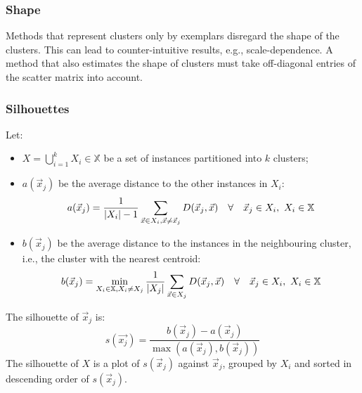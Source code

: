 \subsubsection{Shape}

Methods that represent clusters only by exemplars disregard the shape of the
clusters.
This can lead to counter-intuitive results, e.g., scale-dependence.
A method that also estimates the shape of clusters must take off-diagonal
entries of the scatter matrix into account.

\subsubsection{Silhouettes}

\begin{dfn}[Silhouette]
  Let:
  \begin{itemize}
    \item $X = \bigcup_{i = 1}^{k} X_i \in \mathbb{X}$ be a set of instances
          partitioned into $k$ clusters;
    \item $a(\vec{x}_j)$ be the average distance to the other instances in $X_i$:
          \begin{equation}
            a(\vec{x}_j) =
            \frac{1}{|X_i| - 1}
            \sum_{\vec{x} \in X_i, \vec{x} \neq \vec{x}_j} D(\vec{x}_j, \vec{x})
            \quad\forall\quad
            \vec{x}_j \in X_i,\ X_i \in \mathbb{X}
          \end{equation}
    \item $b(\vec{x}_j)$ be the average distance to the instances in the
          neighbouring cluster, i.e., the cluster with the nearest centroid:
          \begin{equation}
            b(\vec{x}_j) =
            \min_{X_i \in \mathbb{X}, X_i \neq X_j}
            \frac{1}{|X_j|}
            \sum_{\vec{x} \in X_j} D(\vec{x}_j, \vec{x})
            \quad\forall\quad
            \vec{x}_j \in X_i,\ X_i \in \mathbb{X}
          \end{equation}
  \end{itemize}
  The silhouette of $\vec{x}_j$ is:
  \begin{equation}
    s(\vec{x_j}) =
    \frac{b(\vec{x}_j) - a(\vec{x}_j)}{\max(a(\vec{x}_j), b(\vec{x}_j))}
  \end{equation}
  The silhouette of $X$ is a plot of $s(\vec{x}_j)$ against $\vec{x}_j$, grouped
  by $X_i$ and sorted in descending order of $s(\vec{x}_j)$.
\end{dfn}

